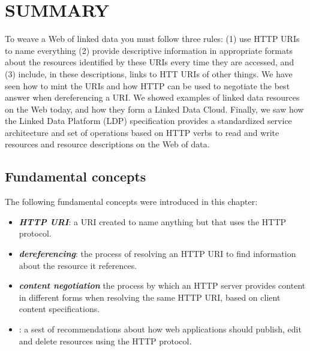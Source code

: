 % 




\hypertarget{summary}{%
\section{SUMMARY}\label{summary:ch5}}

To weave a Web of linked data you must follow three rules: (1) use HTTP
URIs to name everything (2) provide descriptive information in
appropriate formats about the resources identified by these URIs every
time they are accessed, and (3) include, in these descriptions, links to
HTT URIs of other things. We have seen how to mint the URIs and how
HTTP can be used to negotiate the best answer when dereferencing a URI.
We showed examples of linked data resources on the Web today, and how they form
a Linked Data Cloud. 
Finally, we saw how
the Linked Data Platform (LDP) specification provides a standardized service
architecture and set of operations based on HTTP verbs to read and write
resources and resource descriptions on the Web of data.

\hypertarget{fundamental-concepts}{%
\subsection{Fundamental concepts}\label{fundamental-concepts}}

The following fundamental concepts were introduced in this chapter:

\begin{itemize}
\item
  \emph{\textbf{HTTP URI}}: a URI created to name anything but that
  uses the HTTP protocol.
\item
  \emph{\textbf{dereferencing}}: the process of resolving an HTTP URI to find information about 
  the resource it references. 
\item
  \emph{\textbf{content negotiation}} the process by which an HTTP server provides content in different forms when 
  resolving the
  same HTTP URI, based on client content specifications.  

\item 
  \emph{}: a sest of recommendations about how web applications should 
  publish, edit and delete resources using the HTTP protocol.
\end{itemize}


